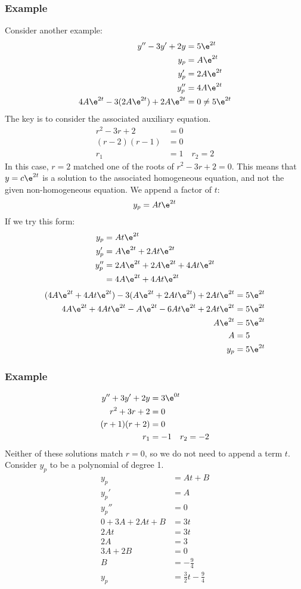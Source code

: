\documentclass{math}
\begin{document}
\subsubsection*{Example}
Consider another example:
\begin{align*}
  y''-3y'+2y &= 5\e^{2t} \\
  y_p &= A\e^{2t} \\
  y_p' &= 2A\e^{2t} \\
  y_p'' &= 4A\e^{2t} \\
  4A\e^{2t}-3(2A\e^{2t})+2A\e^{2t} &= 0 \ne 5\e^{2t}
\end{align*}
The key is to consider the associated auxiliary equation.
\begin{align*}
  r^2-3r+2 &= 0 \\
  (r-2)(r-1) &= 0 \\
  r_1 &= 1 \quad r_2 = 2
\end{align*}
In this case, \( r = 2 \) matched one of the roots of \( r^2-3r+2 = 0 \). This
means that \( y = c\e^{2t} \) is a solution to the associated homogeneous
equation, and not the given non-homogeneous equation. We append a factor of
\( t \):
\[ y_p = At\e^{2t} \]
If we try this form:
\begin{align*}
  y_p &= At\e^{2t} \\
  y_p' &= A\e^{2t}+2At\e^{2t} \\
  y_p'' &= 2A\e^{2t}+2A\e^{2t}+4At\e^{2t} \\
  &= 4A\e^{2t}+4At\e^{2t}
\end{align*}
\begin{align*}
  (4A\e^{2t}+4At\e^{2t})-3(A\e^{2t}+2At\e^{2t})+2At\e^{2t} &= 5\e^{2t} \\
  4A\e^{2t}+4At\e^{2t}-A\e^{2t}-6At\e^{2t}+2At\e^{2t} &= 5\e^{2t} \\
  A\e^{2t} &= 5\e^{2t} \\
  A &= 5 \\
  y_p &= 5\e^{2t}
\end{align*}

\subsubsection*{Example}
\begin{align*}
  y''+3y'+2y &= 3\e^{0t} \\
  r^2+3r+2 &= 0 \\
  (r+1)(r+2) &= 0 \\
  r_1 &= -1 \quad r_2 = -2
\end{align*}
Neither of these solutions match \( r = 0 \), so we do not need to append a term
\( t \). Consider \( y_p \) to be a polynomial of degree 1.
\begin{align*}
  y_p &= At+B \\
  y_p' &= A \\
  y_p'' &= 0 \\
  0+3A+2At+B &= 3t \\
  2At &= 3t \\
  2A &= 3 \\
  3A+2B &= 0 \\
  B &= -\frac{9}{4} \\
  y_p &= \frac{3}{2}t-\frac{9}{4}
\end{align*}
\end{document}
